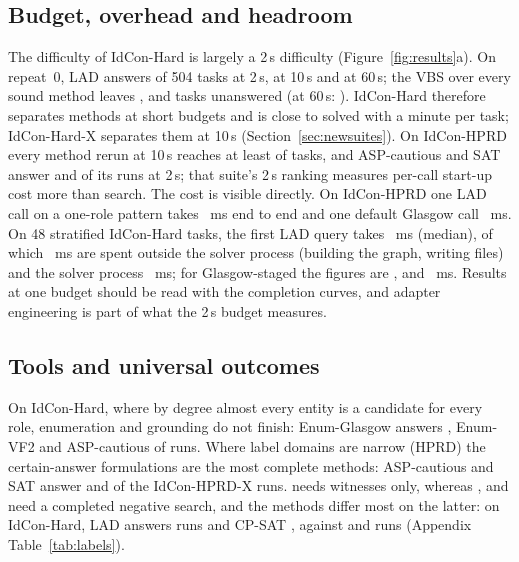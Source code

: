 \subsection{Budget, overhead and headroom}
\label{sec:budget}
The difficulty of IdCon-Hard is largely a 2\,s difficulty (Figure~\ref{fig:results}a). On repeat~0, LAD answers \hardLadRepTwo{} of 504 tasks at 2\,s, \hardLadRepTen{} at 10\,s and \hardLadRepSixty{} at 60\,s; the VBS over every sound method leaves \hardVBSAllUnsolvedTwo{}, \hardVBSAllUnsolvedTen{} and \hardVBSAllUnsolvedSixty{} tasks unanswered (at 60\,s: \hardVBSSixtyLabels{}). IdCon-Hard therefore separates methods at short budgets and is close to solved with a minute per task; IdCon-Hard-X separates them at 10\,s (Section~\ref{sec:newsuites}). On IdCon-HPRD every method rerun at 10\,s reaches at least \hprdGlasgowTenS{} of \hprdRepZeroN{} tasks, and ASP-cautious and SAT answer \hprdASPcautiousCorrect{} and \hprdSATCorrect{} of its \hprdSATAssessed{} runs at 2\,s; that suite's 2\,s ranking measures per-call start-up cost more than search. The cost is visible directly. On IdCon-HPRD one LAD call on a one-role pattern takes \ovhLadOneRole~ms end to end and one default Glasgow call \ovhGlasgowOneRole~ms. On 48 stratified IdCon-Hard tasks, the first LAD query takes \ovhHardLadTotal~ms (median), of which \ovhHardLadOutside~ms are spent outside the solver process (building the graph, writing files) and the solver process \ovhHardLadSolver~ms; for Glasgow-staged the figures are \ovhHardGSTotal, \ovhHardGSOutside{} and \ovhHardGSSolver~ms. Results at one budget should be read with the completion curves, and adapter engineering is part of what the 2\,s budget measures.

\subsection{Tools and universal outcomes}
\label{sec:tools}
On IdCon-Hard, where by degree almost every entity is a candidate for every role, enumeration and grounding do not finish: Enum-Glasgow answers \hardEnumGlasgowCorrect{}, Enum-VF2 \hardEnumVFTwoCorrect{} and ASP-cautious \hardASPcautiousCorrect{} of \hardEnumGlasgowAssessed{} runs. Where label domains are narrow (HPRD) the certain-answer formulations are the most complete methods: ASP-cautious and SAT answer \hprdxASPcautiousCorrect{} and \hprdxSATCorrect{} of the \hprdxSATAssessed{} IdCon-HPRD-X runs. \Unk{} needs witnesses only, whereas \Sat{}, \Vio{} and \Emp{} need a completed negative search, and the methods differ most on the latter: on IdCon-Hard, LAD answers \hardLADSatCorrect{} \Sat{} runs and CP-SAT \hardCPSATSatCorrect{}, against \hardLADUnkCorrect{} and \hardCPSATUnkCorrect{} \Unk{} runs (Appendix Table~\ref{tab:labels}).

